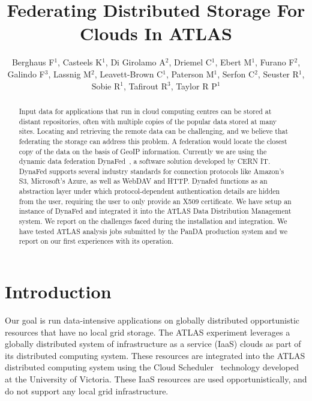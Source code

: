 \documentclass[a4paper]{jpconf}
\begin{document}
\title{Federating Distributed Storage For Clouds In ATLAS}


\author{Berghaus F$^1$, Casteels K$^1$, Di Girolamo A$^2$, Driemel C$^1$, Ebert M$^1$, Furano F$^2$, Galindo F$^3$, Lassnig M$^2$, Leavett-Brown C$^1$, Paterson M$^1$, Serfon C$^2$, Seuster R$^1$, Sobie R$^1$, Tafirout R$^3$, Taylor R P$^1$}
\address{$^1$ University of Victoria, Canada\\$^2$ CERN,  Switzerland\\$^3$ TRIUMF, Canada}


\begin{abstract}
Input data for applications that run in cloud computing centres can be stored at distant repositories, often with multiple copies of the popular data stored at many sites. Locating and retrieving the remote data can be challenging, and we believe that federating the storage can address this problem. A federation would locate the closest copy of the data on the basis of GeoIP information. Currently we are using the dynamic data federation DynaFed~\cite{dynafed}, a software solution developed by CERN IT. DynaFed supports several industry standards for connection protocols like Amazon's S3, Microsoft's Azure, as well as WebDAV and HTTP. Dynafed functions as an abstraction layer under which protocol-dependent authentication details are  hidden from the user, requiring the user to only provide an X509 certificate. We have setup an instance of DynaFed and integrated it into the ATLAS Data Distribution Management system. We report on the challenges faced during the installation and integration. We have tested ATLAS analysis jobs submitted by the PanDA production system and we report on our first experiences with its operation.
\end{abstract}

\section{Introduction}
Our goal is run data-intensive applications on globally distributed opportunistic resources that have no local grid storage. The ATLAS experiment leverages a globally distributed system of infrastructure as a service (IaaS) clouds as part of its distributed computing system. These resources are integrated into the ATLAS distributed computing system using the Cloud Scheduler~\cite{cloud-scheduler} technology developed at the University of Victoria. These IaaS resources are used opportunistically, and do not support any local grid infrastructure.
\end{document}
